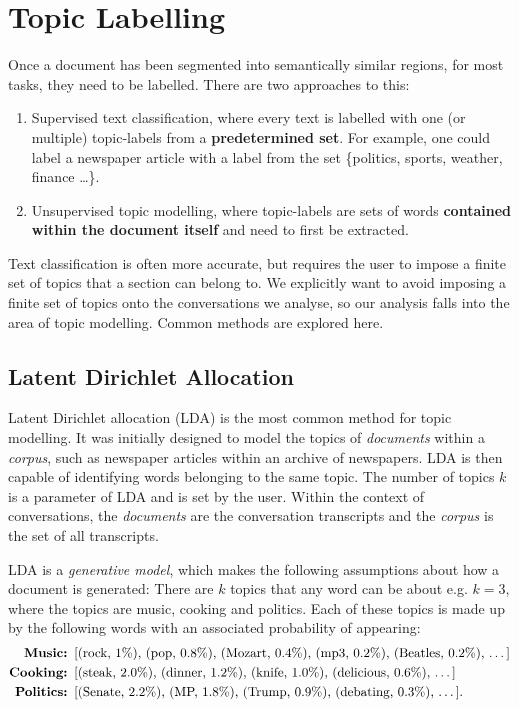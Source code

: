 \section{Topic Labelling \label{ssec: topic labelling}}

Once a document has been segmented into semantically similar regions, for most tasks, they need to be labelled. There are two approaches to this:

\begin{enumerate}
    \item Supervised text classification, where every text is labelled with one (or multiple) topic-labels from a \textbf{predetermined set}\cite{surverTextClassification}. For example, one could label a newspaper article with a label from the set \{politics, sports, weather, finance \dots\}.
    \item Unsupervised topic modelling, where topic-labels are sets of words \textbf{contained within the document itself} and need to first be extracted.
\end{enumerate}

Text classification is often more accurate, but requires the user to impose a finite set of topics that a section can belong to. We explicitly want to avoid imposing a finite set of topics onto the conversations we analyse, so our analysis falls into the area of topic modelling. Common methods are explored here.


\subsection{Latent Dirichlet Allocation \label{ssec: LDA}}
    Latent Dirichlet allocation (LDA)\cite{blei2003latent} is the most common method for topic modelling. It was initially designed to model the topics of \textit{documents} within a \textit{corpus}, such as newspaper articles within an archive of newspapers. LDA is then capable of identifying words belonging to the same topic. The number of topics $k$ is a parameter of LDA and is set by the user.
    Within the context of conversations, the \textit{documents} are the conversation transcripts and the \textit{corpus} is the set of all transcripts.
    
    LDA is a \textit{generative model}, which makes the following assumptions about how a document is generated: There are $k$ topics that any word can be about e.g. $k=3$, where the topics are music, cooking and politics. Each of these topics is made up by the following words with an associated probability of appearing:
    \begin{align*}
        \textbf{Music:  }& \text{[(rock, 1\%), (pop, 0.8\%), (Mozart, 0.4\%), (mp3, 0.2\%), (Beatles, 0.2\%), \dots]}\\
        \textbf{Cooking:    }& \text{[(steak, 2.0\%), (dinner, 1.2\%), (knife, 1.0\%), (delicious, 0.6\%), \dots]}\\
        \textbf{Politics:   }& \text{[(Senate, 2.2\%), (MP, 1.8\%), (Trump, 0.9\%), (debating, 0.3\%), \dots]}.
    \end{align*} 
     
